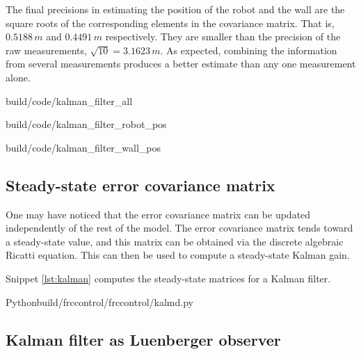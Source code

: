 The final precisions in estimating the position of the robot and the wall are
the square roots of the corresponding elements in the covariance matrix. That
is, $0.5188\,m$ and $0.4491\,m$ respectively. They are smaller than the
precision of the raw measurements, $\sqrt{10} = 3.1623\,m$. As expected,
combining the information from several measurements produces a better estimate
than any one measurement alone.

\begin{svg}{build/code/kalman_filter_all}
  \caption{State estimates and measurements with Kalman filter}
  \label{fig:filter_all}
\end{svg}

\begin{svg}{build/code/kalman_filter_robot_pos}
  \caption{Robot position estimate and variance with Kalman filter}
  \label{fig:filter_robot_pos}
\end{svg}

\begin{svg}{build/code/kalman_filter_wall_pos}
  \caption{Wall position estimate and variance with Kalman filter}
  \label{fig:filter_wall_pos}
\end{svg}

\subsection{Steady-state error covariance matrix}

One may have noticed that the error covariance matrix can be updated
independently of the rest of the \gls{model}. The error covariance matrix tends
toward a steady-state value, and this matrix can be obtained via the discrete
algebraic Ricatti equation. This can then be used to compute a steady-state
Kalman gain.

Snippet \ref{lst:kalman} computes the steady-state matrices for a Kalman
filter.

\begin{code}{Python}{build/frccontrol/frccontrol/kalmd.py}
  \caption{Steady-state Kalman gain and error covariance matrices calculation in
    Python}
  \label{lst:kalman}
\end{code}

\subsection{Kalman filter as Luenberger observer}

